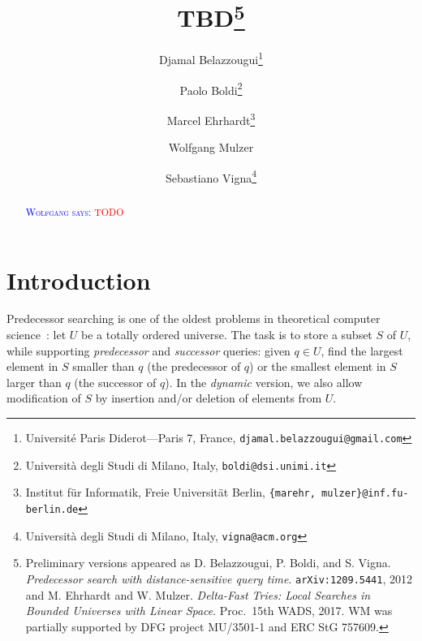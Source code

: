 \documentclass[a4paper,11pt]{article}
\title{TBD\footnote{
Preliminary versions appeared as 
D. Belazzougui, P. Boldi, and S. Vigna. 
\emph{Predecessor search with distance-sensitive query
time}. \texttt{arXiv:1209.5441}, 2012
and 
M. Ehrhardt and W. Mulzer.  \emph{Delta-Fast Tries: Local 
Searches in Bounded Universes with Linear Space}. Proc.~15th WADS,
2017.  WM was partially 
supported by DFG project MU/3501-1 and ERC StG 757609.}}
\author{Djamal Belazzougui\thanks{Universit\'e Paris 
        Diderot---Paris 7, France,
        \texttt{djamal.belazzougui@gmail.com}}
        \and
        Paolo Boldi\thanks{Universit\`a degli Studi di Milano, Italy, 
	\texttt{boldi@dsi.unimi.it}}
        \and
        Marcel Ehrhardt\thanks{Institut f\"ur Informatik, Freie 
	Universit\"at Berlin,
        \texttt{\{marehr, mulzer\}@inf.fu-berlin.de}}
        \and 
        Wolfgang Mulzer\footnotemark[4]
        \and 
        Sebastiano Vigna\thanks{Universit\`a 
	degli Studi di Milano, Italy, 
	\texttt{vigna@acm.org}}
        }
\date{}
\newcommand{\?}{\mskip1.5mu}
\newcommand{\aremark}[3]{\textcolor{blue}{\textsc{#1 #2:}}
  \textcolor{red}{\textsf{#3}}}
\newcommand{\wolfgang}[2][says]{\aremark{Wolfgang}{#1}{#2}}
\begin{document}
\maketitle

\begin{abstract}
\wolfgang{TODO}
\end{abstract}

\section{Introduction}

Predecessor searching is one of the oldest problems 
in theoretical computer science~\cite{CormenLeRiSt09,Knuth98}: 
let $U$ be a totally ordered universe. The task is 
to store a subset $S$ of $U$, while supporting 
\emph{predecessor} and \emph{successor} queries: 
given $q \in U$, find the largest element in $S$ 
smaller than $q$ (the predecessor of $q$) or the 
smallest element in $S$ larger than $q$ (the 
successor of $q$). In the \emph{dynamic} version, 
we also allow modification of $S$ by insertion 
and/or deletion of elements from $U$.
\end{document}
